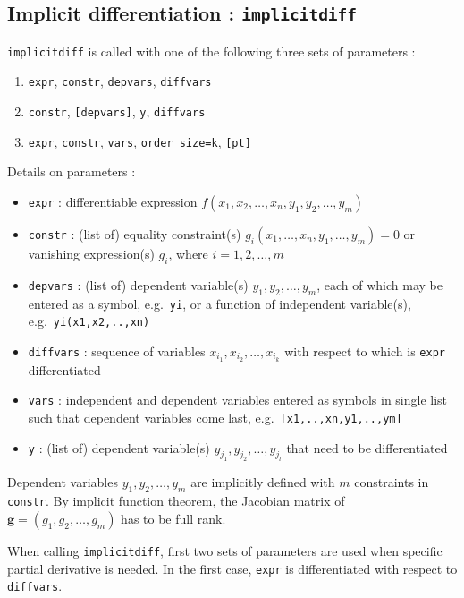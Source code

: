 \documentclass[a4paper,11pt]{book}
\begin{document}
\subsection{Implicit differentiation : {\tt implicitdiff}}
{\tt implicitdiff} is called with one of the following three sets of parameters :
\begin{enumerate}
\item {\tt expr}, {\tt constr}, {\tt depvars}, {\tt diffvars}
\item {\tt constr}, {\tt [depvars]}, {\tt y}, {\tt diffvars}
\item {\tt expr}, {\tt constr}, {\tt vars}, {\tt order\_size=k}, {\tt [pt]}
\end{enumerate}
Details on parameters :
\begin{itemize}
\item {\tt expr} : differentiable expression $ f(x_1,x_2,\dots,x_n,y_1,y_2,\dots,y_m) $
\item {\tt constr} : (list of) equality constraint(s) $ g_i(x_1,\dots,x_n,y_1,\dots,y_m)=0 $ or vanishing expression(s) $ g_i $, where $ i=1,2,\dots,m $
\item {\tt depvars} : (list of) dependent variable(s) $ y_1,y_2,\dots,y_m $, each of which may be entered as a symbol, e.g.~{\tt yi}, or a function of independent variable(s), e.g.~{\tt yi(x1,x2,..,xn)}
\item {\tt diffvars} : sequence of variables $ x_{i_1},x_{i_2},\dots,x_{i_k} $ with respect to which is {\tt expr} differentiated
\item {\tt vars} : independent and dependent variables entered as symbols in single list such that dependent variables come last, e.g.~{\tt [x1,..,xn,y1,..,ym]}
\item {\tt y} : (list of) dependent variable(s) $ y_{j_1},y_{j_2},\dots,y_{j_l} $ that need to be differentiated
\end{itemize}
Dependent variables $ y_1,y_2,\dots,y_m $ are implicitly defined with $ m $ constraints in {\tt constr}. By implicit function theorem, the Jacobian matrix of $ \mathbf{g}=(g_1,g_2,\dots,g_m) $ has to be full rank.

When calling {\tt implicitdiff}, first two sets of parameters are used when specific partial derivative is needed. In the first case, {\tt expr} is differentiated with respect to {\tt diffvars}.
\end{document}
